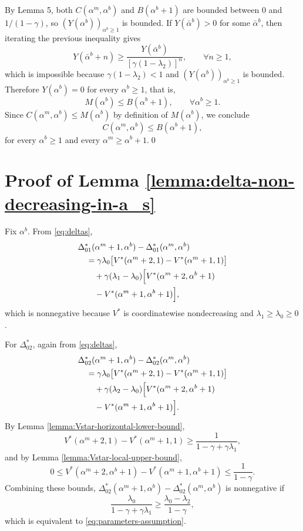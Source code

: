 \documentclass[letterpaper,journal]{IEEEtran}
\begin{document}
By Lemma 5, both $C(\alpha^m,\alpha^b)$ and $B(\alpha^b+1)$ are bounded between $0$ and
$1/(1-\gamma)$, so $(Y(\alpha^b))_{\alpha^b\ge 1}$ is bounded. If $Y(\bar\alpha^b)>0$ for some
$\bar\alpha^b$, then iterating the previous inequality gives
\[
Y(\bar\alpha^b+n)\ge \frac{Y(\bar\alpha^b)}{[\gamma(1-\lambda_2)]^n},
\qquad \forall n\ge 1,
\]
which is impossible because $\gamma(1-\lambda_2)<1$ and $(Y(\alpha^b))_{\alpha^b\ge 1}$ is bounded.
Therefore $Y(\alpha^b)=0$ for every $\alpha^b\ge 1$, that is,
\[
M(\alpha^b)\le B(\alpha^b+1),\qquad \forall \alpha^b\ge 1.
\]
Since $C(\alpha^m,\alpha^b)\le M(\alpha^b)$ by definition of $M(\alpha^b)$, we conclude
\[
C(\alpha^m,\alpha^b)\le B(\alpha^b+1),
\]
for every $\alpha^b\ge 1$ and every $\alpha^m\ge \alpha^b+1$.\qed


\section{Proof of Lemma \ref{lemma:delta-non-decreasing-in-a_s}}
\label{app:delta-non-decreasing-in-a_s}

Fix $\alpha^b$. From \eqref{eq:deltas},
\begin{align*}
&\Delta^*_{01}(\alpha^m+1,\alpha^b)-\Delta^*_{01}(\alpha^m,\alpha^b)\\
&\quad=\gamma\lambda_0\bigl[V^*(\alpha^m+2,1)-V^*(\alpha^m+1,1)\bigr]\\
&\qquad+\gamma(\lambda_1-\lambda_0)\Bigl[
V^*(\alpha^m+2,\alpha^b+1)\\
&\qquad -V^*(\alpha^m+1,\alpha^b+1)\Bigr],
\end{align*}
which is nonnegative because $V^*$ is coordinatewise nondecreasing and $\lambda_1\geq \lambda_0\geq 0$.

For $\Delta^*_{02}$, again from \eqref{eq:deltas},
\begin{align*}
&\Delta^*_{02}(\alpha^m+1,\alpha^b)-\Delta^*_{02}(\alpha^m,\alpha^b)\\
&\quad=\gamma\lambda_0\bigl[V^*(\alpha^m+2,1)-V^*(\alpha^m+1,1)\bigr]\\
&\qquad+\gamma(\lambda_2-\lambda_0)\Bigl[
V^*(\alpha^m+2,\alpha^b+1)\\
&\qquad -V^*(\alpha^m+1,\alpha^b+1)\Bigr].
\end{align*}
By Lemma \ref{lemma:Vstar-horizontal-lower-bound},
\[
V^*(\alpha^m+2,1)-V^*(\alpha^m+1,1) \geq \frac{1}{1-\gamma+\gamma\lambda_1},
\]
and by Lemma \ref{lemma:Vstar-local-upper-bound},
\[
0\leq V^*(\alpha^m+2,\alpha^b+1)-V^*(\alpha^m+1,\alpha^b+1)\leq \frac{1}{1-\gamma}.
\]
Combining these bounds, $\Delta^*_{02}(\alpha^m+1,\alpha^b)-\Delta^*_{02}(\alpha^m,\alpha^b)$ is nonnegative if
\[
\frac{\lambda_0}{1-\gamma+\gamma\lambda_1} \geq \frac{\lambda_0-\lambda_2}{1-\gamma},
\]
which is equivalent to \eqref{eq:parameters-assumption}.
\end{document}
